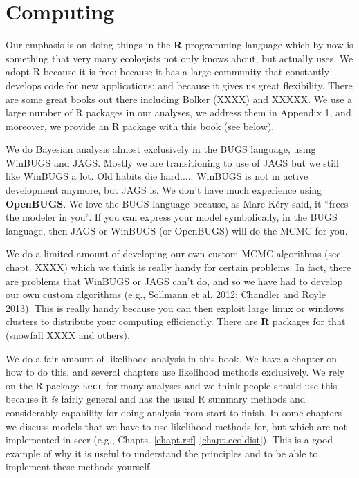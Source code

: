 \section*{Computing}

Our emphasis is on doing things in the {\bf R} programming language
which by now is something that very many ecologists not only knows
about, but actually uses. We adopt R because it is free; because it
has a large community that constantly develops code for new
applications; and because it gives us great flexibility.  There are
some great books out there including Bolker (XXXX) and XXXXX. We use a
large number of R packages in our analyses, we address them in
Appendix 1, and moreover, we provide an R package with this book (see
below).

We do Bayesian analysis almost exclusively in the BUGS language, using
WinBUGS and JAGS. Mostly we are transitioning to use of JAGS but we
still like WinBUGS a lot. Old habits die hard..... WinBUGS is not in
active development anymore, but JAGS is. We don't have much experience
using {\bf OpenBUGS}.
We love the BUGS language
because, as Marc K\'{e}ry said, it ``frees the modeler in you''.
If you can express your model symbolically, in the BUGS language,
then JAGS or WinBUGS (or OpenBUGS) will do the MCMC for you. 

We do a limited amount of developing our own custom MCMC algorithms
(see chapt. XXXX) which we think is really handy for certain
problems. In fact, there are problems that WinBUGS or JAGS can't do,
and so we have had to develop our own custom algorithms (e.g.,
Sollmann et al. 2012; Chandler and Royle 2013). 
This is really handy because you can then exploit large linux or
windows clusters to distribute your computing efficienctly. There are
{\bf R} packages for that (snowfall XXXX and others).

We do a fair amount of likelihood analysis in this book. We have a
chapter on how to do this, and several chapters use likelihood methods
exclusively. We rely on the R package \mbox{\tt secr}
\citep{efford_etal:2009euring} for many analyses and we think people
should use this because it {\it is} fairly general and has the usual R
summary methods and considerably capability for doing analysis from
start to finish. In some chapters we discuss models that we have to
use likelihood methods for, but which are not implemented in secr
(e.g., Chapts. \ref{chapt.rsf} \ref{chapt.ecoldist}). This is a good
example of why it is useful to understand the principles and to be
able to implement these methods yourself.


